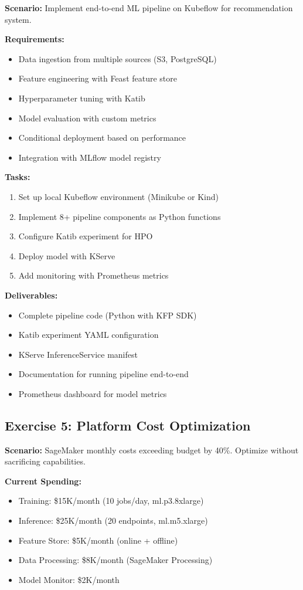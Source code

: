 \textbf{Scenario:} Implement end-to-end ML pipeline on Kubeflow for recommendation system.

\textbf{Requirements:}
\begin{itemize}
    \item Data ingestion from multiple sources (S3, PostgreSQL)
    \item Feature engineering with Feast feature store
    \item Hyperparameter tuning with Katib
    \item Model evaluation with custom metrics
    \item Conditional deployment based on performance
    \item Integration with MLflow model registry
\end{itemize}

\textbf{Tasks:}
\begin{enumerate}
    \item Set up local Kubeflow environment (Minikube or Kind)
    \item Implement 8+ pipeline components as Python functions
    \item Configure Katib experiment for HPO
    \item Deploy model with KServe
    \item Add monitoring with Prometheus metrics
\end{enumerate}

\textbf{Deliverables:}
\begin{itemize}
    \item Complete pipeline code (Python with KFP SDK)
    \item Katib experiment YAML configuration
    \item KServe InferenceService manifest
    \item Documentation for running pipeline end-to-end
    \item Prometheus dashboard for model metrics
\end{itemize}

\subsection{Exercise 5: Platform Cost Optimization}

\textbf{Scenario:} SageMaker monthly costs exceeding budget by 40\%. Optimize without sacrificing capabilities.

\textbf{Current Spending:}
\begin{itemize}
    \item Training: \$15K/month (10 jobs/day, ml.p3.8xlarge)
    \item Inference: \$25K/month (20 endpoints, ml.m5.xlarge)
    \item Feature Store: \$5K/month (online + offline)
    \item Data Processing: \$8K/month (SageMaker Processing)
    \item Model Monitor: \$2K/month
\end{itemize}

